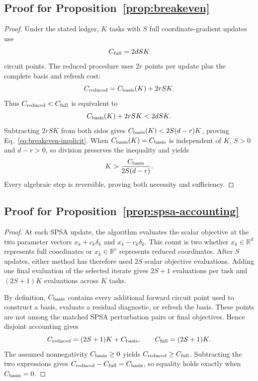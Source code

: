 \documentclass[aps,prx,reprint,superscriptaddress,floatfix]{revtex4-2}
\newcommand{\R}{\mathbb{R}}
\begin{document}
\subsection{Proof for Proposition~\ref{prop:breakeven}}
\label{app:proof-break}

\begin{proof}
Under the stated ledger, $K$ tasks with $S$ full coordinate-gradient updates
use
\[
 C_{\rm full}=2dSK
\]
circuit points.  The reduced procedure uses $2r$ points per update plus the
complete basis and refresh cost:
\[
 C_{\rm reduced}=C_{\rm basis}(K)+2rSK.
\]
Thus $C_{\rm reduced}<C_{\rm full}$ is equivalent to
\[
 C_{\rm basis}(K)+2rSK<2dSK.
\]
Subtracting $2rSK$ from both sides gives
$C_{\rm basis}(K)<2S(d-r)K$, proving
Eq.~\eqref{eq:breakeven-implicit}.  When
$C_{\rm basis}(K)=C_{\rm basis}$ is independent of $K$, $S>0$ and $d-r>0$,
so division preserves the inequality and yields
\[
 K>\frac{C_{\rm basis}}{2S(d-r)}.
\]
Every algebraic step is reversible, proving both necessity and sufficiency.
\end{proof}

\subsection{Proof for Proposition~\ref{prop:spsa-accounting}}
\label{app:proof-spsa-accounting}

\begin{proof}
At each SPSA update, the algorithm evaluates the scalar objective at the two
parameter vectors
$x_k+c_k\delta_k$ and $x_k-c_k\delta_k$.  This count is two whether
$x_k\in\R^d$ represents full coordinates or
$x_k\in\R^r$ represents reduced coordinates.  After $S$ updates, either
method has therefore used $2S$ scalar objective evaluations.  Adding one
final evaluation of the selected iterate gives $2S+1$ evaluations per task
and $(2S+1)K$ evaluations across $K$ tasks.

By definition, $C_{\rm basis}$ contains every additional forward circuit point
used to construct a basis, evaluate a residual diagnostic, or refresh the
basis.  These points are not among the matched SPSA perturbation pairs or
final objectives.  Hence disjoint accounting gives
\[
 C_{\rm reduced}=(2S+1)K+C_{\rm basis},
 \qquad C_{\rm full}=(2S+1)K.
\]
The assumed nonnegativity $C_{\rm basis}\ge0$ yields
$C_{\rm reduced}\ge C_{\rm full}$.  Subtracting the two expressions gives
$C_{\rm reduced}-C_{\rm full}=C_{\rm basis}$, so equality holds exactly when
$C_{\rm basis}=0$.
\end{proof}
\end{document}

